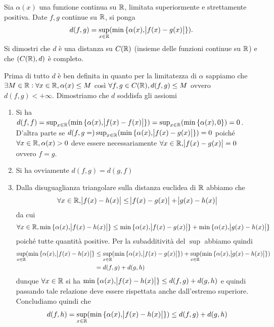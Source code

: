 \begin{es}
  Sia $ \alpha(x) $ una funzione continua su $ \mathbb{R} $, limitata superiormente e strettamente positiva. Date $ f, g $ continue su $ \mathbb{R} $, si ponga \[d(f, g) = \sup_{x \in \mathbb{R}}(\min{\{\alpha(x), \abs{f(x) - g(x)}\}}).\] Si dimostri che $ d $ è una distanza su $ C(\mathbb{R}) $ (insieme delle funzioni continue su $ \mathbb{R} $) e che $ (C(\mathbb{R}), d) $ è completo.
\end{es}
%
Prima di tutto $ d $ è ben definita in quanto per la limitatezza di $ \alpha $ sappiamo che $ \exists M \in \mathbb{R} : \forall x \in \mathbb{R}, \alpha(x) \leq M $ così $ \forall f, g \in C(\mathbb{R}), d(f, g) \leq M $ ovvero $ d(f, g) < +\infty $. Dimostriamo che $ d $ soddisfa gli assiomi
\begin{enumerate}[label = (\roman*)]
\item Si ha $ d(f, f) = \sup_{x \in \mathbb{R}}(\min{\{\alpha(x), \abs{f(x) - f(x)}\}}) = \sup_{x \in \mathbb{R}}(\min{\{\alpha(x), 0\}}) = 0 $. D'altra parte se $ d(f, g = )\sup_{x \in \mathbb{R}}(\min{\{\alpha(x), \abs{f(x) - g(x)}\}}) = 0 $ poiché $ \forall x \in \mathbb{R}, \alpha(x) > 0 $ deve essere necessariamente $ \forall x \in \mathbb{R}, \abs{f(x) - g(x)} = 0 $ ovvero $ f = g $.
\item Si ha ovviamente $ d(f, g) = d(g, f) $
\item Dalla disuguaglianza triangolare sulla distanza euclidea di $ \mathbb{R} $ abbiamo che \[\forall x \in \mathbb{R},  \abs{f(x) - h(x)} \leq \abs{f(x) - g(x)} + \abs{g(x) - h(x)}\] da cui \[\forall x \in \mathbb{R},  \min{\{\alpha(x), \abs{f(x) - h(x)}\}} \leq \min{\{\alpha(x), \abs{f(x) - g(x)}\}} + \min{\{\alpha(x), \abs{g(x) - h(x)}\}}\] poiché tutte quantità positive. Per la subadditività del $ \sup $ abbiamo quindi
  \begin{align*}
    \sup_{x \in \mathbb{R}} (\min{\{\alpha(x), \abs{f(x) - h(x)}\}} & \leq \sup_{x \in \mathbb{R}}(\min{\{\alpha(x), \abs{f(x) - g(x)}\}}) + \sup_{x \in \mathbb{R}}(\min{\{\alpha(x), \abs{g(x) - h(x)}\}}) \\
                                                            & = d(f, g) + d(g, h)
  \end{align*}
  dunque $ \forall x \in \mathbb{R} $ si ha $ \min{\{\alpha(x), \abs{f(x) - h(x)}\}} \leq d(f, g) + d(g, h) $ e quindi passando tale relazione deve essere rispettata anche dall'estremo superiore. Concludiamo quindi che \[d(f, h) = \sup_{x \in \mathbb{R}}(\min{\{\alpha(x), \abs{f(x) - h(x)}\}}) \leq d(f, g) + d(g, h)\]
\end{enumerate}
